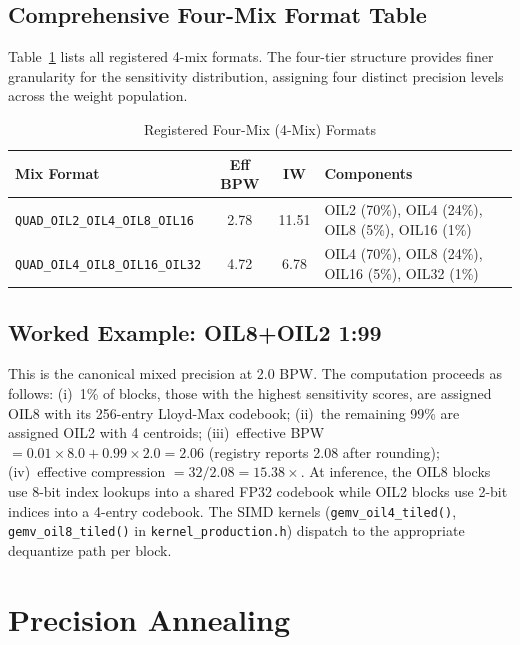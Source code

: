 \subsection{Comprehensive Four-Mix Format Table}

Table~\ref{tab:four_mix} lists all registered 4-mix formats.  The
four-tier structure provides finer granularity for the sensitivity
distribution, assigning four distinct precision levels across the weight
population.

\begin{table}[htbp]
\centering
\caption{Registered Four-Mix (4-Mix) Formats}
\label{tab:four_mix}
\small
\begin{tabular}{l c c l}
\toprule
\textbf{Mix Format} & \textbf{Eff BPW} & \textbf{IW} & \textbf{Components} \\
\midrule
\texttt{QUAD\_OIL2\_OIL4\_OIL8\_OIL16}  & 2.78 & 11.51 & OIL2 (70\%), OIL4 (24\%), OIL8 (5\%), OIL16 (1\%) \\
\texttt{QUAD\_OIL4\_OIL8\_OIL16\_OIL32} & 4.72 & 6.78  & OIL4 (70\%), OIL8 (24\%), OIL16 (5\%), OIL32 (1\%) \\
\bottomrule
\end{tabular}
\end{table}

\subsection{Worked Example: OIL8+OIL2 1:99}

This is the canonical mixed precision at 2.0 BPW.  The computation
proceeds as follows: (i)~1\% of blocks, those with the highest
sensitivity scores, are assigned OIL8 with its 256-entry Lloyd-Max
codebook; (ii)~the remaining 99\% are assigned OIL2 with 4 centroids;
(iii)~effective BPW $= 0.01 \times 8.0 + 0.99 \times 2.0 = 2.06$
(registry reports 2.08 after rounding); (iv)~effective compression $=
32 / 2.08 = 15.38\times$.  At inference, the OIL8 blocks use 8-bit
index lookups into a shared FP32 codebook while OIL2 blocks use 2-bit
indices into a 4-entry codebook.  The SIMD kernels
(\texttt{gemv\_oil4\_tiled()}, \texttt{gemv\_oil8\_tiled()} in
\texttt{kernel\_production.h}) dispatch to the appropriate dequantize
path per block.

\section{Precision Annealing}
\label{sec:annealing}

